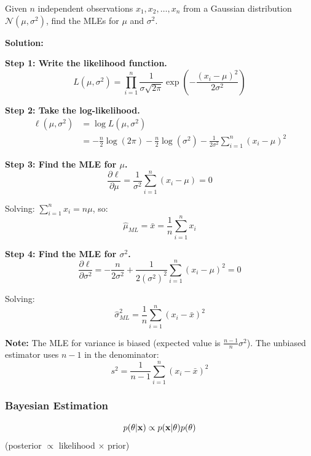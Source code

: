 \begin{examplebox}[title=Example: Maximum Likelihood Estimation for Gaussian Parameters]
Given $n$ independent observations $x_1, x_2, \ldots, x_n$ from a Gaussian distribution $\mathcal{N}(\mu, \sigma^2)$, find the MLEs for $\mu$ and $\sigma^2$.

\textbf{Solution:}

\textbf{Step 1: Write the likelihood function.}
\begin{equation*}
L(\mu, \sigma^2) = \prod_{i=1}^n \frac{1}{\sigma\sqrt{2\pi}} \exp\left(-\frac{(x_i-\mu)^2}{2\sigma^2}\right)
\end{equation*}

\textbf{Step 2: Take the log-likelihood.}
\begin{align*}
\ell(\mu, \sigma^2) &= \log L(\mu, \sigma^2) \\
&= -\frac{n}{2}\log(2\pi) - \frac{n}{2}\log(\sigma^2) - \frac{1}{2\sigma^2}\sum_{i=1}^n (x_i - \mu)^2
\end{align*}

\textbf{Step 3: Find the MLE for $\mu$.}
\begin{equation*}
\frac{\partial \ell}{\partial \mu} = \frac{1}{\sigma^2}\sum_{i=1}^n (x_i - \mu) = 0
\end{equation*}

Solving: $\sum_{i=1}^n x_i = n\mu$, so:
\begin{equation*}
\boxed{\hat{\mu}_{ML} = \bar{x} = \frac{1}{n}\sum_{i=1}^n x_i}
\end{equation*}

\textbf{Step 4: Find the MLE for $\sigma^2$.}
\begin{equation*}
\frac{\partial \ell}{\partial \sigma^2} = -\frac{n}{2\sigma^2} + \frac{1}{2(\sigma^2)^2}\sum_{i=1}^n (x_i - \mu)^2 = 0
\end{equation*}

Solving:
\begin{equation*}
\boxed{\hat{\sigma}^2_{ML} = \frac{1}{n}\sum_{i=1}^n (x_i - \bar{x})^2}
\end{equation*}

\textbf{Note:} The MLE for variance is biased (expected value is $\frac{n-1}{n}\sigma^2$). The unbiased estimator uses $n-1$ in the denominator:
\begin{equation*}
s^2 = \frac{1}{n-1}\sum_{i=1}^n (x_i - \bar{x})^2
\end{equation*}
\end{examplebox}

\subsubsection{Bayesian Estimation}
\begin{equation}
p(\theta|\mathbf{x}) \propto p(\mathbf{x}|\theta)p(\theta)
\end{equation}
(posterior $\propto$ likelihood $\times$ prior)

